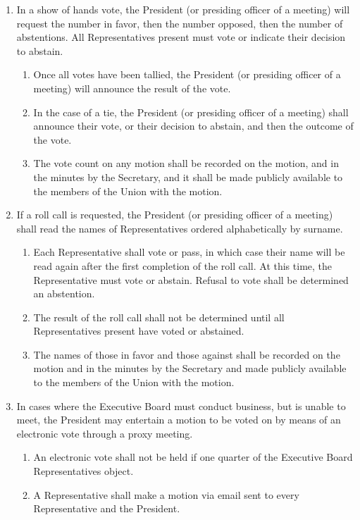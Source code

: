 \begin{enumerate}
\item In a show of hands vote, the President (or presiding officer of a meeting) will request the number in favor, then the number opposed, then the number of abstentions. All Representatives present must vote or indicate their decision to abstain.
  \begin{enumerate}
  \item Once all votes have been tallied, the President (or presiding officer of a meeting) will announce the result of the vote.
  \item In the case of a tie, the President (or presiding officer of a meeting) shall announce their vote, or their decision to abstain, and then the outcome of the vote.
  \item The vote count on any motion shall be recorded on the motion, and in the minutes by the Secretary, and it shall be made publicly available to the members of the Union with the motion.
  \end{enumerate}
\item If a roll call is requested, the President (or presiding officer of a meeting) shall read the names of Representatives ordered alphabetically by surname.
  \begin{enumerate}
  \item Each Representative shall vote or pass, in which case their name will be read again after the first completion of the roll call. At this time, the Representative must vote or abstain. Refusal to vote shall be determined an abstention.
  \item The result of the roll call shall not be determined until all Representatives present have voted or abstained.
  \item The names of those in favor and those against shall be recorded on the motion and in the minutes by the Secretary and made publicly available to the members of the Union with the motion.
  \end{enumerate}
\item In cases where the Executive Board must conduct business, but is unable to meet, the President may entertain a motion to be voted on by means of an electronic vote through a proxy meeting.
  \begin{enumerate}
  \item An electronic vote shall not be held if one quarter of the Executive Board Representatives object.
  \item A Representative shall make a motion via email sent to every Representative and the President.

\end{enumerate}
\end{enumerate}
